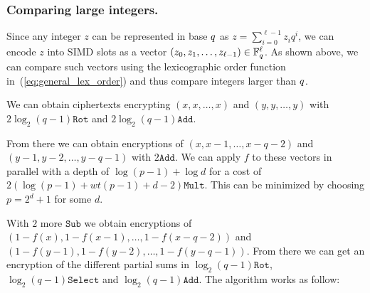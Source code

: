   \subsubsection{Comparing large integers.}
  Since any integer $z$ can be represented in base $q$ as $z = \sum_{i=0}^{\ell-1} z_i q^i$, we can encode $z$ into SIMD slots as a vector $(z_0,z_1,\dots,z_{\ell-1}) \in \mathbb{F}_{q}^\ell$.
  As shown above, we can compare such vectors using the lexicographic order function in~(\ref{eq:general_lex_order}) and thus compare integers larger than $q$.

  We can obtain ciphertexts encrypting $(x,x,\ldots, x)$ and $(y,y,\ldots, y)$ with $2\log_2(q-1)\texttt{Rot}$ and $2\log_2(q-1)\texttt{Add}$. 

  From there we can obtain encryptions of $(x,x-1,\ldots, x-q-2)$ and $(y-1,y-2,\ldots, y-q-1)$ with $2\texttt{Add}$. We can apply $f$ to these vectors in parallel with a depth of $\log (p-1) + \log d$ for a cost of $2(\log (p-1) + wt(p-1) + d - 2) \texttt{Mult}$. This can be minimized by choosing $p = 2^d + 1$ for some $d$.

  With $2$ more $\texttt{Sub}$ we obtain encryptions of $(1-f(x), 1-f(x-1), \ldots, 1-f(x-q-2))$ and $(1-f(y-1), 1-f(y-2), \ldots, 1-f(y-q-1))$. From there we can get an encryption of the different partial sums in $\log_2(q-1)\texttt{Rot}$, $\log_2(q-1)\texttt{Select}$ and $\log_2(q-1)\texttt{Add}$. The algorithm works as follow:

